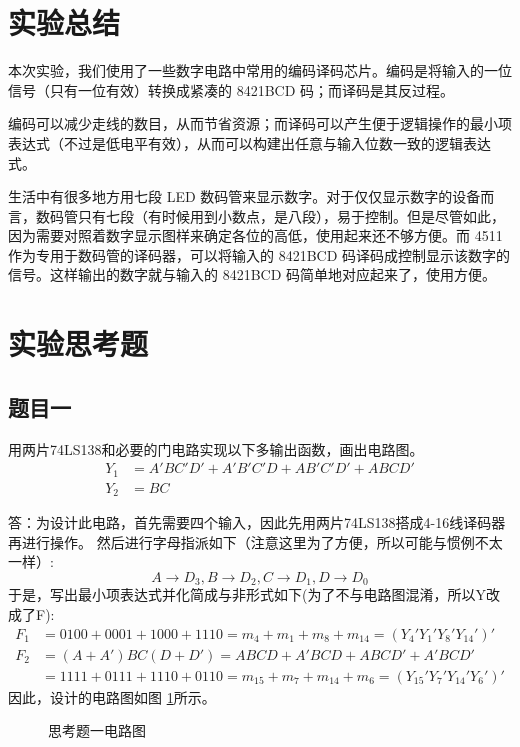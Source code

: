 \documentclass[a4paper,11pt,UTF8]{ctexart}
\begin{document}
\section{实验总结}
	\par 本次实验，我们使用了一些数字电路中常用的编码译码芯片。编码是将输入的一位信号（只有一位有效）转换成紧凑的 8421BCD 码；而译码是其反过程。
	\par 编码可以减少走线的数目，从而节省资源；而译码可以产生便于逻辑操作的最小项表达式（不过是低电平有效），从而可以构建出任意与输入位数一致的逻辑表达式。
	\par 生活中有很多地方用七段 LED 数码管来显示数字。对于仅仅显示数字的设备而言，数码管只有七段（有时候用到小数点，是八段），易于控制。但是尽管如此，因为需要对照着数字显示图样来确定各位的高低，使用起来还不够方便。而 4511 作为专用于数码管的译码器，可以将输入的 8421BCD 码译码成控制显示该数字的信号。这样输出的数字就与输入的 8421BCD 码简单地对应起来了，使用方便。
\section{实验思考题}
\subsection{题目一}
用两片74LS138和必要的门电路实现以下多输出函数，画出电路图。
\begin{equation}
  \begin{aligned}
    Y_1&=A'BC'D'+A'B'C'D+AB'C'D'+ABCD'\\
    Y_2&=BC
  \end{aligned}
\end{equation}

答：为设计此电路，首先需要四个输入，因此先用两片74LS138搭成4-16线译码器再进行操作。
然后进行字母指派如下（注意这里为了方便，所以可能与惯例不太一样）:
\begin{equation}
  A\rightarrow D_3,B\rightarrow D_2,C\rightarrow D_1,D\rightarrow D_0
\end{equation}
于是，写出最小项表达式并化简成与非形式如下(为了不与电路图混淆，所以Y改成了F):
\begin{equation}
  \begin{aligned}
    F_1&=0100+0001+1000+1110=m_4+m_1+m_8+m_{14}=(Y_4'Y_1'Y_8'Y_{14}')'\\
    F_2&=(A+A')BC(D+D')=ABCD+A'BCD+ABCD'+A'BCD'\\
       &=1111+0111+1110+0110=m_{15}+m_7+m_{14}+m_6=(Y_{15}'Y_7'Y_{14}'Y_6')'
  \end{aligned}
\end{equation}
因此，设计的电路图如图 \ref{fig:pb1}所示。

\begin{figure}[H]
  \centering
  \caption{思考题一电路图}
  \label{fig:pb1}
  \end{figure}
\end{document}
